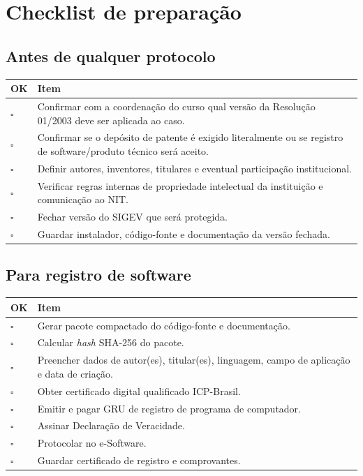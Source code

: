 \section{Checklist de preparação}

\subsection{Antes de qualquer protocolo}

\begin{longtable}{p{}p{}}
\textbf{OK} & \textbf{Item} \\
\hline
$\square$ & Confirmar com a coordenação do curso qual versão da Resolução 01/2003 deve ser aplicada ao caso. \\
$\square$ & Confirmar se o depósito de patente é exigido literalmente ou se registro de software/produto técnico será aceito. \\
$\square$ & Definir autores, inventores, titulares e eventual participação institucional. \\
$\square$ & Verificar regras internas de propriedade intelectual da instituição e comunicação ao NIT. \\
$\square$ & Fechar versão do SIGEV que será protegida. \\
$\square$ & Guardar instalador, código-fonte e documentação da versão fechada. \\
\end{longtable}

\subsection{Para registro de software}

\begin{longtable}{p{}p{}}
\textbf{OK} & \textbf{Item} \\
\hline
$\square$ & Gerar pacote compactado do código-fonte e documentação. \\
$\square$ & Calcular \textit{hash} SHA-256 do pacote. \\
$\square$ & Preencher dados de autor(es), titular(es), linguagem, campo de aplicação e data de criação. \\
$\square$ & Obter certificado digital qualificado ICP-Brasil. \\
$\square$ & Emitir e pagar GRU de registro de programa de computador. \\
$\square$ & Assinar Declaração de Veracidade. \\
$\square$ & Protocolar no e-Software. \\
$\square$ & Guardar certificado de registro e comprovantes. \\
\end{longtable}

